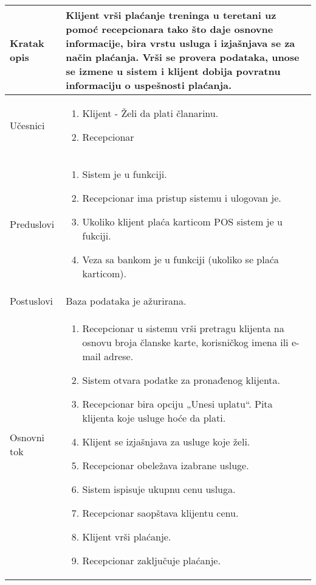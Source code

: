 \documentclass[../main.tex]{subfiles}
\begin{document}
\begin{longtable}{| p{} | p{} |} 

\hline
    Kratak opis &  Klijent vrši plaćanje treninga u teretani uz pomoć recepcionara tako što daje osnovne informacije, bira vrstu usluga i izjašnjava se za način plaćanja. Vrši se provera podataka, unose se izmene u sistem i klijent dobija povratnu informaciju o uspešnosti plaćanja.\\ 
\hline    
    Učesnici & 
    	\begin{enumerate}
        \item Klijent - Želi da plati članarinu. 
        \item Recepcionar
     \end{enumerate}\\
\hline
   Preduslovi & \begin{enumerate}
       \item Sistem je u funkciji.
       \item Recepcionar ima pristup sistemu i ulogovan je.
       \item Ukoliko klijent plaća karticom POS sistem je u fukciji.
       \item Veza sa bankom je u funkciji (ukoliko se plaća karticom).	
   \end{enumerate}\\
\hline  
    Postuslovi & 
         Baza podataka je ažurirana.
    \\
\hline
    Osnovni tok & \begin{enumerate}
        \item Recepcionar u sistemu vrši pretragu klijenta na osnovu broja članske karte, korisničkog imena ili e-mail adrese.
        \item Sistem otvara podatke za pronađenog klijenta.
        \item Recepcionar bira opciju „Unesi uplatu“. Pita klijenta koje usluge hoće da plati.
        \item Klijent se izjašnjava za usluge koje želi.
        \item Recepcionar obeležava izabrane usluge.
        \item Sistem ispisuje ukupnu cenu usluga.
        \item Recepcionar saopštava klijentu cenu.
        \item Klijent vrši plaćanje.
        \item Recepcionar zaključuje plaćanje.

\end{enumerate}
\end{longtable}
\end{document}

